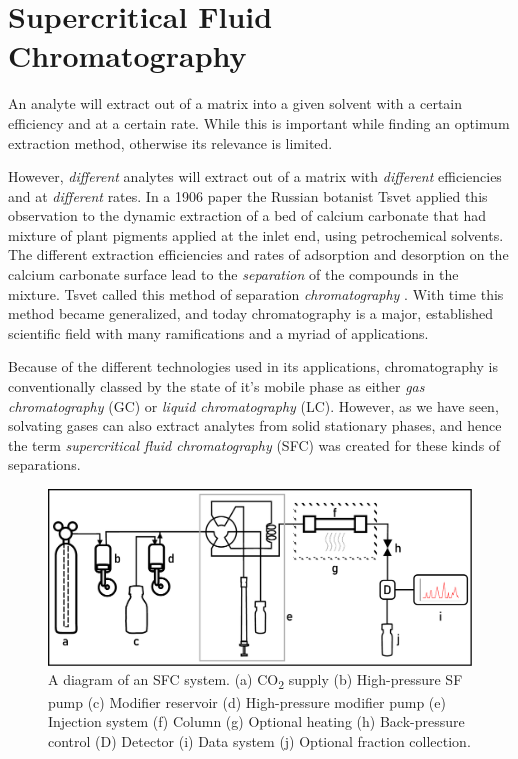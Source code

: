 \section{Supercritical Fluid Chromatography}

An analyte will extract out of a matrix into a given solvent with a certain
efficiency and at a certain rate. While this is important while finding an
optimum extraction method, otherwise its relevance is limited.

However, \textit{different} analytes will extract out of a matrix with
\textit{different} efficiencies and at \textit{different} rates. In a 1906 paper
the Russian botanist Tsvet applied this observation to the dynamic extraction of
a bed of calcium carbonate that had mixture of plant pigments applied at the
inlet end, using petrochemical solvents. The different extraction efficiencies
and rates of adsorption and desorption on the calcium carbonate surface lead to
the \textit{separation} of the compounds in the mixture. Tsvet called this
method of separation \textit{chromatography} \autocite{Ettre1993,Ettre1993a}.
With time this method became generalized, and today chromatography is a major,
established scientific field with many ramifications and a myriad of
applications.

Because of the different technologies used in its applications, chromatography
is conventionally classed by the state of it's mobile phase as either
\textit{gas chromatography} (GC) or \textit{liquid chromatography} (LC).
However, as we have seen, solvating gases can also extract analytes from solid
stationary phases, and hence the term \textit{supercritical fluid
chromatography} (SFC) was created for these kinds of separations.

\begin{figure}
\centering
\includegraphics[width=\textwidth]{Figures/SFC_System}
\decoRule
\caption[SFC system diagram]{A diagram of an SFC system. (a) CO\textsubscript{2}
supply (b) High-pressure SF pump (c) Modifier reservoir (d) High-pressure
modifier pump (e) Injection system (f) Column (g) Optional heating (h)
Back-pressure control (D) Detector (i) Data system (j) Optional fraction
collection.}
\label{fig:sfcdiagram}

\end{figure}

